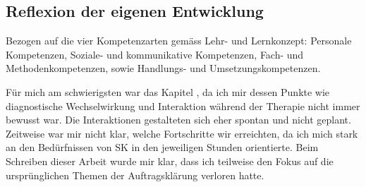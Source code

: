 \subsection{Reflexion der eigenen Entwicklung} \label{sec:reflexionEntwicklung}
Bezogen auf die vier Kompetenzarten gemäss Lehr- und Lernkonzept: Personale Kompetenzen, Soziale- und kommunikative Kompetenzen, Fach- und Methodenkompetenzen, sowie Handlungs- und Umsetzungskompetenzen.


Für mich am schwierigsten war das Kapitel , da ich mir dessen Punkte wie diagnostische Wechselwirkung und Interaktion während der Therapie nicht immer bewusst war. Die Interaktionen gestalteten sich eher spontan und nicht geplant. Zeitweise war mir nicht klar, welche Fortschritte wir erreichten, da ich mich stark an den Bedürfnissen von SK in den jeweiligen Stunden orientierte. Beim Schreiben dieser Arbeit wurde mir klar, dass ich teilweise den Fokus auf die ursprünglichen Themen der Auftragsklärung verloren hatte. 
